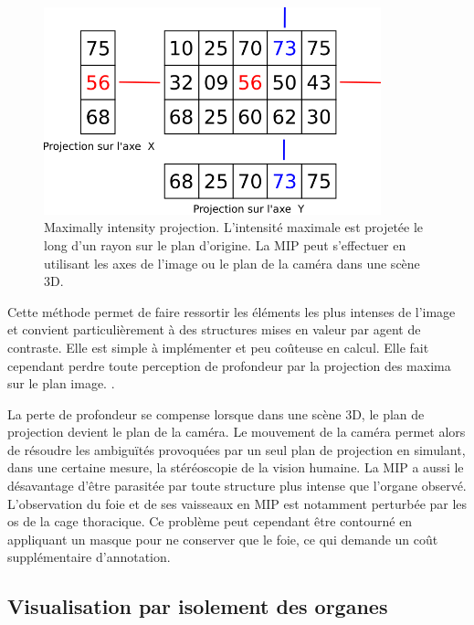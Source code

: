       \begin{figure}[h]
        \centering
        \includegraphics[height=6cm]{Images/3D_mip_ray.png}
        \caption{Maximally intensity projection. L'intensité maximale est projetée le long d'un rayon sur le plan d'origine. La MIP peut s'effectuer en utilisant les axes de l'image ou le plan de la caméra dans une scène 3D.}
        \label{fig:MIP_visualisation}
      \end{figure}

      Cette méthode permet de faire ressortir les éléments les plus intenses de l'image et convient particulièrement à des structures mises en valeur par agent de contraste. Elle est simple à implémenter et peu coûteuse en calcul. Elle fait cependant perdre toute perception de profondeur par la projection des maxima sur le plan image. .

      La perte de profondeur se compense lorsque dans une scène 3D, le plan de projection devient le plan de la caméra. Le mouvement de la caméra permet alors de résoudre les ambiguïtés provoquées par un seul plan de projection en simulant, dans une certaine mesure, la stéréoscopie de la vision humaine.
      La MIP a aussi le désavantage d'être parasitée par toute structure plus intense que l'organe observé. L'observation du foie et de ses vaisseaux en MIP est notamment perturbée par les os de la cage thoracique. Ce problème peut cependant être contourné en appliquant un masque pour ne conserver que le foie, ce qui demande un coût supplémentaire d'annotation.

      \subsection{Visualisation par isolement des organes}
      
